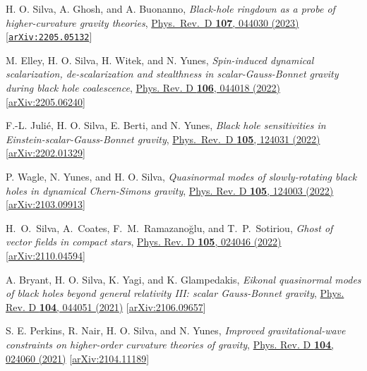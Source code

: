 \documentclass[11pt]{article}
\begin{document}
\begin{etaremune}[
        start=\value{pubCounter},
        topsep=0pt,
        partopsep=0pt]
    \item H. O. Silva, A. Ghosh, and A. Buonanno,
    \emph{Black-hole ringdown as a probe of higher-curvature gravity theories},
    \href{https://journals.aps.org/prd/abstract/10.1103/PhysRevD.107.044030}{Phys.~Rev.~D {\bf 107}, 044030 (2023)} [\href{https://arxiv.org/abs/2212.09655}{\nolinkurl{arXiv:2205.05132}}]

    \item M. Elley, H. O. Silva, H. Witek, and N. Yunes,
    \emph{Spin-induced dynamical scalarization, de-scalarization and stealthness in scalar-Gauss-Bonnet gravity during black hole coalescence},
    \href{https://journals.aps.org/prd/abstract/10.1103/PhysRevD.106.044018}{Phys. Rev. D {\bf 106}, 044018 (2022)}
    [\href{https://arxiv.org/abs/2205.06240}{arXiv:2205.06240}]

    \item F.-L. Juli\'e, H. O. Silva, E. Berti, and N. Yunes,
    \emph{Black hole sensitivities in Einstein-scalar-Gauss-Bonnet gravity},
    \href{https://journals.aps.org/prd/abstract/10.1103/PhysRevD.105.124031}{Phys.~Rev.~D {\bf 105}, 124031 (2022)}
    [\href{https://arxiv.org/abs/2202.01329}{arXiv:2202.01329}]

    \item P. Wagle, N. Yunes, and H. O. Silva,
    \emph{Quasinormal modes of slowly-rotating black holes in dynamical Chern-Simons gravity},
    \href{https://journals.aps.org/prd/abstract/10.1103/PhysRevD.105.124003}{Phys. Rev. D {\bf 105}, 124003 (2022)}
    [\href{https://arxiv.org/abs/2103.09913}{arXiv:2103.09913}]

    \item H.~O.~Silva, A.~Coates, F.~M.~Ramazano\u{g}lu, and T.~P.~Sotiriou,
    \emph{Ghost of vector fields in compact stars},
    \href{https://journals.aps.org/prd/abstract/10.1103/PhysRevD.105.024046}{Phys. Rev. D {\bf 105}, 024046 (2022)}
    [\href{https://arxiv.org/abs/2110.04594}{arXiv:2110.04594}]

    \item A. Bryant, H. O. Silva, K. Yagi, and K. Glampedakis,
    \emph{Eikonal quasinormal modes of black holes beyond general relativity III: scalar Gauss-Bonnet gravity},
    \href{https://journals.aps.org/prd/abstract/10.1103/PhysRevD.104.044051}{Phys. Rev. D {\bf 104}, 044051 (2021)}
    [\href{https://arxiv.org/abs/2106.09657}{arXiv:2106.09657}]

    \item S. E. Perkins, R. Nair, H. O. Silva, and N. Yunes,
    \emph{Improved gravitational-wave constraints on higher-order curvature theories of gravity},
    \href{https://journals.aps.org/prd/abstract/10.1103/PhysRevD.104.024060}{Phys. Rev. D {\bf 104}, 024060 (2021)}
    [\href{https://arxiv.org/abs/2104.11189}{arXiv:2104.11189}]


\end{etaremune}
\end{document}
